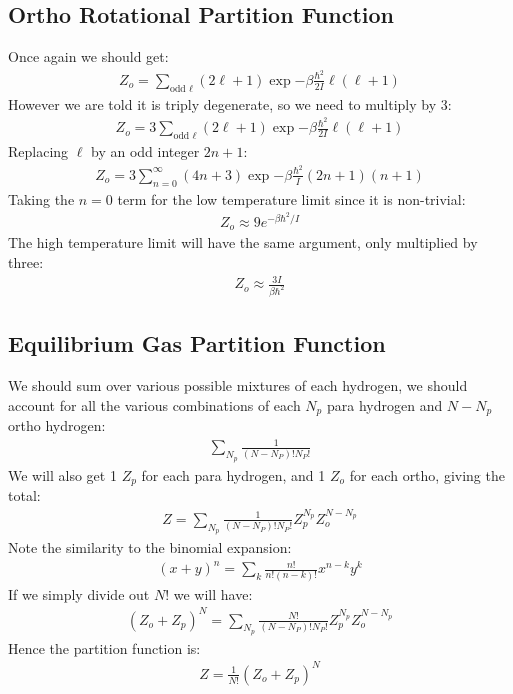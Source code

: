 \documentclass[12pt]{article}
\begin{document}
\subsection{Ortho Rotational Partition Function}
Once again we should get:
\begin{align*}
  Z_o=\sum_{\text{odd }\ell}(2\ell+1)\exp{-\beta\frac{\hbar^2}{2I}\ell(\ell+1)}
\end{align*}
However we are told it is triply degenerate, so we need to multiply by 3:
\begin{align*}
  Z_o=3\sum_{\text{odd }\ell}(2\ell+1)\exp{-\beta\frac{\hbar^2}{2I}\ell(\ell+1)}
\end{align*}
Replacing $\ell$ by an odd integer $2n+1$:
\begin{align*}
  Z_o=3\sum_{n=0}^\infty(4n+3)\exp{-\beta\frac{\hbar^2}{I}(2n+1)(n+1)}
\end{align*}
Taking the $n=0$ term for the low temperature limit since it is non-trivial:
\begin{align}
  \boxed{Z_o\approx9e^{-\beta\hbar^2/I}}
\end{align}
The high temperature limit will have the same argument, only multiplied by three:
\begin{align*}
  \boxed{Z_o\approx\frac{3I}{\beta\hbar^2}}
\end{align*}

\subsection{Equilibrium Gas Partition Function}
We should sum over various possible mixtures of each hydrogen, we should account for all the various combinations of each $N_p$ para hydrogen and $N-N_p$ ortho hydrogen:
\begin{align*}
  \sum_{N_p}\frac1{(N-N_P)!N_P!}
\end{align*}
We will also get 1 $Z_p$ for each para hydrogen, and 1 $Z_o$ for each ortho, giving the total:
\begin{align*}
  Z=\sum_{N_p}\frac1{(N-N_P)!N_P!}Z_p^{N_p}Z_o^{N-N_p}
\end{align*}
Note the similarity to the binomial expansion:
\begin{align*}
  (x+y)^n=\sum_k\frac{n!}{n!(n-k)!}x^{n-k}y^k
\end{align*}
If we simply divide out $N!$ we will have:
\begin{align*}
  (Z_o+Z_p)^N=\sum_{N_p}\frac{N!}{(N-N_P)!N_P!}Z_p^{N_p}Z_o^{N-N_p}
\end{align*}
Hence the partition function is:
\begin{align}
  \boxed{Z=\frac1{N!}(Z_o+Z_p)^N}
\end{align}
\end{document}
